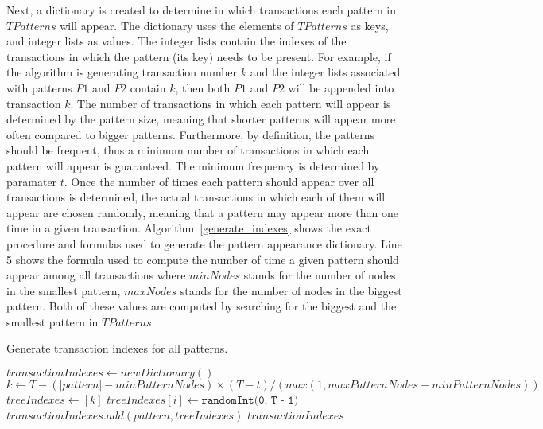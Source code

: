 \documentclass{acm_proc_article-sp-sigmod09}
\begin{document}
Next, a dictionary is created to determine in which transactions each pattern in $TPatterns$ will appear. The dictionary uses the elements of $TPatterns$ as keys, and integer lists as values. The integer lists contain the indexes of the transactions in which the pattern (its key) needs to be present. For example, if the algorithm is generating transaction number $k$ and the integer lists associated with patterns $P1$ and $P2$ contain $k$, then both $P1$ and $P2$ will be appended into transaction $k$. The number of transactions in which each pattern will appear is determined by the pattern size, meaning that shorter patterns will appear more often compared to bigger patterns. Furthermore, by definition, the patterns should be frequent, thus a minimum number of transactions in which each pattern will appear is guaranteed. The minimum frequency is determined by paramater $t$. Once the number of times each pattern should appear over all transactions is determined, the actual transactions in which each of them will appear are chosen randomly, meaning that a pattern may appear more than one time in a given transaction. Algorithm~\ref{generate_indexes} shows the exact procedure and formulas used to generate the pattern appearance dictionary. Line 5 shows the formula used to compute the number of time a given pattern should appear among all transactions where $minNodes$ stands for the number of nodes in the smallest pattern, $maxNodes$ stands for the number of nodes in the biggest pattern. Both of these values are computed by searching for the biggest and the smallest pattern in $TPatterns$.
\begin{algorithm}
\caption{Generate transaction indexes for all patterns.}
\label{generate_indexes}
\begin{algorithmic}[1]
\State $transactionIndexes \gets new Dictionary()$
	\State $k \gets T - (|pattern| - minPatternNodes) \times (T - t) / (max(1, maxPatternNodes - minPatternNodes))$
	\State $treeIndexes \gets [k]$
		\State $treeIndexes[i] \gets \texttt{randomInt(0, T - 1)}$
	\EndFor
	\State $transactionIndexes.add(pattern, treeIndexes)$
\EndFor
\Return $transactionIndexes$
\EndFunction
\end{algorithmic}
\end{algorithm}
\end{document}
